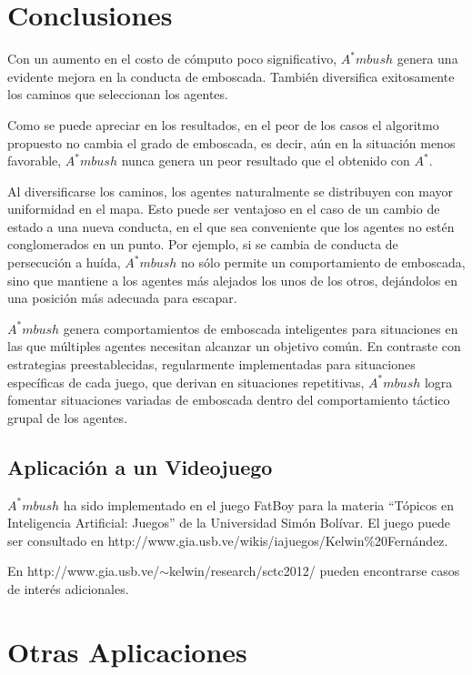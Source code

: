 \documentclass{egpubl}
\begin{document}
\section{Conclusiones}

Con un aumento en el costo de cómputo poco significativo, 
$A^*mbush$ genera una evidente mejora en la conducta de emboscada. 
También diversifica exitosamente los caminos que seleccionan
los agentes.

Como se puede apreciar en los resultados, en el peor de los casos
el algoritmo propuesto no cambia el grado de emboscada, es decir,
aún en la situación menos favorable, $A^*mbush$ nunca genera un peor 
resultado que el obtenido con $A^*$.

Al diversificarse los caminos, los agentes naturalmente se distribuyen con
mayor uniformidad en el mapa. Esto puede ser ventajoso en el caso de un 
cambio de estado a una nueva conducta, en el que sea conveniente que los
agentes no estén conglomerados en un punto. Por ejemplo, si se cambia
de conducta de persecución a huída, $A^*mbush$ no sólo permite un
comportamiento de emboscada, sino que mantiene a los agentes más 
alejados los unos de los otros, dejándolos en una posición más adecuada
para escapar.

$A^*mbush$ genera comportamientos de emboscada inteligentes
para situaciones en las que múltiples agentes necesitan
alcanzar un objetivo común. En contraste con estrategias preestablecidas,
regularmente implementadas para situaciones específicas de cada juego,
que derivan en situaciones repetitivas, $A^*mbush$ logra fomentar
situaciones va\-ria\-das de emboscada dentro del comportamiento
táctico grupal de los agentes.

\subsection{Aplicación a un Videojuego}

$A^*mbush$ ha sido implementado en el juego FatBoy para la
materia ``Tópicos en Inteligencia Artificial: Juegos'' de la
Universidad Simón Bolívar. El juego puede ser consultado en
http://www.gia.usb.ve/wikis/iajuegos/Kelwin\%20Fernández. 

En http://www.gia.usb.ve/$\sim$kelwin/research/sctc2012/
pueden encontrarse casos de interés adicionales.

\section{Otras Aplicaciones}
\end{document}
